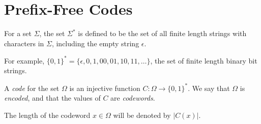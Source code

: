 %

%


\section{Prefix-Free Codes}

\begin{defn}
  For a set $\Sigma$, the set $\Sigma^*$ is defined to be the set of
  all finite length strings with characters in $\Sigma$, including the
  empty string $\epsilon$.
\end{defn}
For example,
$\{0, 1\}^* = \{\epsilon, 0, 1, 00, 01, 10, 11, \ldots\}$, the set of
finite length binary bit strings.

\begin{defn}
  A \emph{code} for the set $\Omega$ is an injective function
  $C : \Omega \to \{0, 1\}^*$. We say that $\Omega$ is \emph{encoded},
  and that the values of $C$ are \emph{codewords}.
\end{defn}

The length of the codeword $x \in \Omega$ will be denoted by $|C(x)|$.

